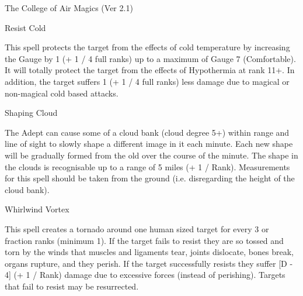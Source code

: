 \begin{Chapter}{The College of Air Magics (Ver 2.1)}
\begin{spell}[S-12]{Resist Cold}

\begin{effects}
This spell protects the target from the effects of cold temperature by
increasing the Gauge by 1 (+ 1 / 4 full ranks) up to a maximum of
Gauge 7 (Comfortable).  It will totally protect the target from the
effects of Hypothermia at rank 11+.  In addition, the target suffers 1
(+ 1 / 4 full ranks) less damage due to magical or non-magical cold
based attacks.
\end{effects}
\end{spell}

\begin{spell}[S-13]{Shaping Cloud}

\begin{effects}
The Adept can cause some of a cloud bank (cloud degree 5+) within
range and line of sight to slowly shape a different image in it each
minute.  Each new shape will be gradually formed from the old over the
course of the minute. The shape in the clouds is recognisable up to a
range of 5 miles (+ 1 / Rank).  Measurements for this spell should be
taken from the ground (i.e. disregarding the height of the cloud
bank).
\end{effects}
\end{spell}

\begin{spell}[S-14]{Whirlwind Vortex}

\begin{effects}
This spell creates a tornado around one human sized target for every 3
or fraction ranks (minimum 1). If the target fails to resist they are
so tossed and torn by the winds that muscles and ligaments tear,
joints dislocate, bones break, organs rupture, and they perish.  If
the target successfully resists they suffer [D - 4] (+ 1 / Rank)
damage due to excessive forces (instead of perishing).  Targets that
fail to resist may be resurrected.
\end{effects}
\end{spell}


\end{Chapter}
